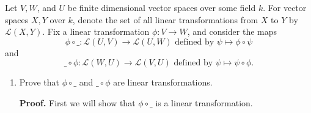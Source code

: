 \documentclass[9pt]{article}
\begin{document}
Let $V, W$, and $U$ be finite dimensional vector spaces over some field $k$. For 
vector spaces $X, Y$ over $k$, denote the set of all linear transformations from
$X$ to $Y$ by $\mathcal{L}(X, Y)$. Fix a linear transformation
$\phi : V \rightarrow W$, and consider the maps
$$\phi \circ \_ : \mathcal{L}(U, V) \rightarrow \mathcal{L}(U, W)
  \text{ defined by } \psi \mapsto \phi \circ \psi$$
and
$$\_ \circ \phi : \mathcal{L}(W, U) \rightarrow \mathcal{L}(V, U)
  \text{ defined by } \psi \mapsto \psi \circ \phi.$$
\begin{enumerate}
   \item Prove that $\phi \circ \_$ and $\_ \circ \phi$ are linear
         transformations.

      \textbf{Proof.} First we will show that $\phi \circ \_$ is a linear
      transformation.
      

\end{enumerate}
\end{document}
